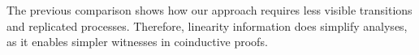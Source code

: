

The previous comparison %
shows how our approach 
requires less visible transitions and replicated processes. 
Therefore, linearity information does simplify analyses, 
as it enables simpler witnesses in  coinductive proofs.





%
